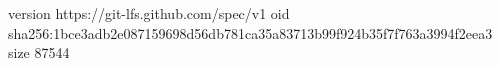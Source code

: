 version https://git-lfs.github.com/spec/v1
oid sha256:1bce3adb2e087159698d56db781ca35a83713b99f924b35f7f763a3994f2eea3
size 87544
